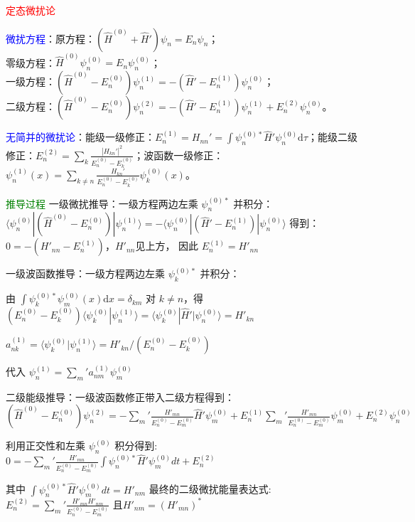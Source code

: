 \documentclass[a4paper,8pt]{extarticle} %
\newcommand{\bluetext}[1]{\textcolor{blue}{#1}}
\newcommand{\redtext}[1]{\textcolor{red}{#1}}
\newcommand{\greentext}[1]{\textcolor{green}{#1}}
\begin{document}
\begin{multicols}{3}
\setlength{\columnsep}{0.1cm} 

\redtext{定态微扰论}

\bluetext{微扰方程}：原方程：$(\hat{H}^{(0)} + \hat{H}')\psi_n = E_n\psi_n$；\\
零级方程：$\hat{H}^{(0)}\psi_n^{(0)} = E_n\psi_n^{(0)}$；\\
一级方程：$(\hat{H}^{(0)} - E_n^{(0)})\psi_n^{(1)} = -(\hat{H}' - E_n^{(1)})\psi_n^{(0)}$；\\
二级方程：$(\hat{H}^{(0)} - E_n^{(0)})\psi_n^{(2)} = -(\hat{H}' - E_n^{(1)})\psi_n^{(1)} + E_n^{(2)}\psi_n^{(0)}$。

\bluetext{无简并的微扰论}：能级一级修正：$E_n^{(1)} = H_{nn}' = \int \psi_n^{(0)*} \hat{H}'\psi_n^{(0)} \mathrm{d}\tau$；能级二级修正：$E_n^{(2)} = \sum_k \frac{|H_{kn}'|^2}{E_n^{(0)}-E_k^{(0)}}$；波函数一级修正：$\psi_n^{(1)}(x) = \sum_{k\neq n} \frac{H_{kn}'}{E_n^{(0)}-E_k^{(0)}} \psi_k^{(0)}(x)$。

\greentext{推导过程}
一级微扰推导：一级方程两边左乘 $\psi_n^{(0)*}$ 并积分：
$\langle\psi_n^{(0)}|(\hat{H}^{(0)}-E_n^{(0)})|\psi_n^{(1)}\rangle = -\langle\psi_n^{(0)}|(\hat{H}'-E_n^{(1)})|\psi_n^{(0)}\rangle$
得到：$0 = -(H'_{nn}-E_n^{(1)})$，$H'_{nn} $见上方，
因此 $E_n^{(1)} = H'_{nn}$

一级波函数推导：一级方程两边左乘 $\psi_k^{(0)*}$ 并积分：

由 $\int\psi_k^{(0)*}\psi_m^{(0)}(x)\mathrm{d}x=\delta_{km}$
对 $k\neq n$，得 $(E_n^{(0)}-E_k^{(0)})\langle\psi_k^{(0)}|\psi_n^{(1)}\rangle = \langle\psi_k^{(0)}|\hat{H}'|\psi_n^{(0)}\rangle = H'_{kn}$

$a_{nk}^{(1)} = \langle\psi_k^{(0)}|\psi_n^{(1)}\rangle = {H'_{kn}}/({E_n^{(0)}-E_k^{(0)}})$

代入 $\psi_n^{(1)} = \sum_m' a_{nm}^{(1)}\psi_m^{(0)}$

二级能级推导：一级波函数修正带入二级方程得到：
$(\hat{H}^{(0)} - E_n^{(0)})\psi_n^{(2)} = -\sum_m' \frac{H'_{mn}}{E_n^{(0)} - E_m^{(0)}} \hat{H}'\psi_m^{(0)} + E_n^{(1)}\sum_m' \frac{H'_{mn}}{E_n^{(0)} - E_m^{(0)}} \psi_m^{(0)} + E_n^{(2)}\psi_n^{(0)}$

利用正交性和左乘 $\psi_n^{(0)}$ 积分得到:
$0 = -\sum_m' \frac{H'_{mn}}{E_n^{(0)} - E_m^{(0)}} \int \psi_n^{(0)*} \hat{H}'\psi_m^{(0)} dt + E_n^{(2)}$

其中 $\int \psi_n^{(0)*} \hat{H}'\psi_m^{(0)} dt = H'_{nm}$
最终的二级微扰能量表达式:
$E_n^{(2)} = \sum_m' \frac{H'_{mn}H'_{nm}}{E_n^{(0)} - E_m^{(0)}}$
且$H'_{nm} = (H'_{mn})^*$


\end{multicols}
\end{document}
